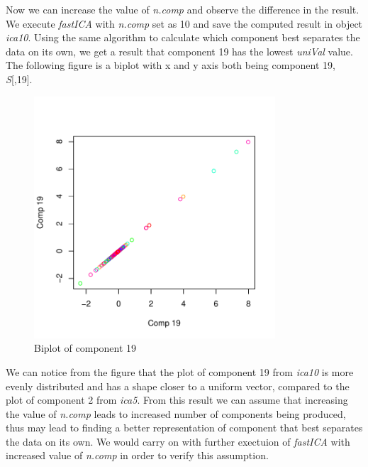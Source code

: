 Now we can increase the value of \emph{n.comp} and observe the difference in the result. We execute \emph{fastICA} with \emph{n.comp} set as 10 and save the computed result in object \emph{ica10}. Using the same algorithm to calculate which component best separates the data on its own, we get a result that component 19 has the lowest \emph{uniVal} value. The following figure is a biplot with x and y axis both being component 19, \emph{S}[,19].
\begin{figure}[H]
    \centering
    \includegraphics[width=9cm]{images/ICA/[10]/comp 19.pdf}  
    \caption{Biplot of component 19}
    \label{fig:[10]comp19} 
\end{figure}
We can notice from the figure that the plot of component 19 from \emph{ica10} is more evenly distributed and has a shape closer to a uniform vector, compared to the plot of component 2 from \emph{ica5}. From this result we can assume that increasing the value of \emph{n.comp} leads to increased number of components being produced, thus may lead to finding a better representation of component that best separates the data on its own. We would carry on with further exectuion of \emph{fastICA} with increased value of \emph{n.comp} in order to verify this assumption.

